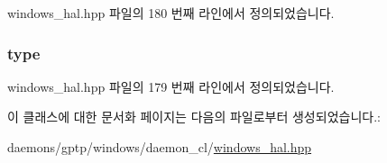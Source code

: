 windows\+\_\+hal.\+hpp 파일의 180 번째 라인에서 정의되었습니다.

\subsubsection[{\texorpdfstring{type}{type}}]{ type\hspace{0.3cm}{\ttfamily [private]}}\hypertarget{class_windows_lock_aeab5ee1f363ea475ef801f98a1da7838}{}\label{class_windows_lock_aeab5ee1f363ea475ef801f98a1da7838}


windows\+\_\+hal.\+hpp 파일의 179 번째 라인에서 정의되었습니다.



이 클래스에 대한 문서화 페이지는 다음의 파일로부터 생성되었습니다.\+:\begin{DoxyCompactItemize}
\item 
daemons/gptp/windows/daemon\+\_\+cl/\hyperlink{windows__hal_8hpp}{windows\+\_\+hal.\+hpp}\end{DoxyCompactItemize}
